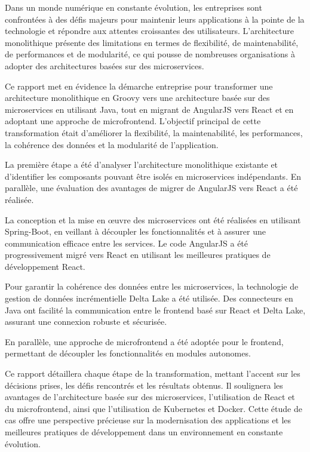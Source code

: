\introduction
Dans un monde numérique en constante évolution, les entreprises sont confrontées à des défis majeurs pour maintenir leurs applications à la pointe de la technologie et répondre aux attentes croissantes des utilisateurs. L'architecture monolithique présente des limitations en termes de flexibilité, de maintenabilité, de performances et de modularité, ce qui pousse de nombreuses organisations à adopter des architectures basées sur des microservices.

\medskip

Ce rapport met en évidence la démarche entreprise pour transformer une architecture monolithique en Groovy vers une architecture basée sur des microservices en utilisant Java, tout en migrant de AngularJS vers React et en adoptant une approche de microfrontend. L'objectif principal de cette transformation était d'améliorer la flexibilité, la maintenabilité, les performances, la cohérence des données et la modularité de l'application.

\medskip

La première étape a été d'analyser l'architecture monolithique existante et d'identifier les composants pouvant être isolés en microservices indépendants. En parallèle, une évaluation des avantages de migrer de AngularJS vers React a été réalisée.

\medskip

La conception et la mise en œuvre des microservices ont été réalisées en utilisant Spring-Boot, en veillant à découpler les fonctionnalités et à assurer une communication efficace entre les services. Le code AngularJS a été progressivement migré vers React en utilisant les meilleures pratiques de développement React.

\medskip

Pour garantir la cohérence des données entre les microservices, la technologie de gestion de données incrémentielle Delta Lake a été utilisée. Des connecteurs en Java ont facilité la communication entre le frontend basé sur React et Delta Lake, assurant une connexion robuste et sécurisée.

\medskip

En parallèle, une approche de microfrontend a été adoptée pour le frontend, permettant de découpler les fonctionnalités en modules autonomes.

\medskip

Ce rapport détaillera chaque étape de la transformation, mettant l'accent sur les décisions prises, les défis rencontrés et les résultats obtenus. Il soulignera les avantages de l'architecture basée sur des microservices, l'utilisation de React et du microfrontend, ainsi que l'utilisation de Kubernetes et Docker. Cette étude de cas offre une perspective précieuse sur la modernisation des applications et les meilleures pratiques de développement dans un environnement en constante évolution.